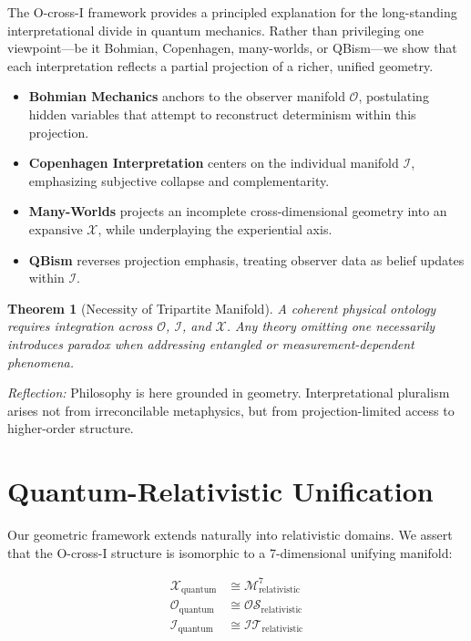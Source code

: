 \documentclass{article}
\newtheorem{theorem}{Theorem}
\begin{document}
The O-cross-I framework provides a principled explanation for the long-standing interpretational divide in quantum mechanics. Rather than privileging one viewpoint—be it Bohmian, Copenhagen, many-worlds, or QBism—we show that each interpretation reflects a partial projection of a richer, unified geometry.

\begin{itemize}
    \item \textbf{Bohmian Mechanics} anchors to the observer manifold $\mathcal{O}$, postulating hidden variables that attempt to reconstruct determinism within this projection.
    \item \textbf{Copenhagen Interpretation} centers on the individual manifold $\mathcal{I}$, emphasizing subjective collapse and complementarity.
    \item \textbf{Many-Worlds} projects an incomplete cross-dimensional geometry into an expansive $\mathcal{X}$, while underplaying the experiential axis.
    \item \textbf{QBism} reverses projection emphasis, treating observer data as belief updates within $\mathcal{I}$.
\end{itemize}

\begin{theorem}[Necessity of Tripartite Manifold]
A coherent physical ontology requires integration across $\mathcal{O}$, $\mathcal{I}$, and $\mathcal{X}$. Any theory omitting one necessarily introduces paradox when addressing entangled or measurement-dependent phenomena.
\end{theorem}

\noindent
\textit{Reflection:} Philosophy is here grounded in geometry. Interpretational pluralism arises not from irreconcilable metaphysics, but from projection-limited access to higher-order structure.

\section{Quantum-Relativistic Unification}

Our geometric framework extends naturally into relativistic domains. We assert that the O-cross-I structure is isomorphic to a 7-dimensional unifying manifold:

\begin{align}
\mathcal{X}_{\text{quantum}} &\cong \mathcal{M}^{7}_{\text{relativistic}} \\
\mathcal{O}_{\text{quantum}} &\cong \mathcal{OS}_{\text{relativistic}} \\
\mathcal{I}_{\text{quantum}} &\cong \mathcal{IT}_{\text{relativistic}}
\end{align}
\end{document}
